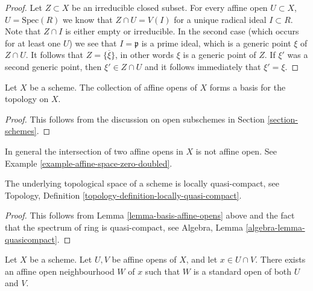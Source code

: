 \begin{proof}
Let $Z \subset X$ be an irreducible closed subset.
For every affine open $U \subset X$, $U = \text{Spec}(R)$
we know that $Z \cap U = V(I)$ for a unique
radical ideal $I \subset R$. Note that $Z \cap I$ is either
empty or irreducible. In the second case (which occurs
for at least one $U$) we see that $I = \mathfrak p$
is a prime ideal, which is a generic point $\xi$ of $Z \cap U$.
It follows that $Z = \overline{\{\xi\}}$, in other words
$\xi$ is a generic point of $Z$. If $\xi'$ was a second
generic point, then $\xi' \in Z \cap U$ and it follows
immediately that $\xi' = \xi$.
\end{proof}

\begin{lemma}
\label{lemma-basis-affine-opens}
Let $X$ be a scheme. The collection of affine opens
of $X$ forms a basis for the topology on $X$.
\end{lemma}

\begin{proof}
This follows from the discussion on open subschemes
in Section \ref{section-schemes}.
\end{proof}

\begin{remark}
\label{remark-intersection-affine-opens}
In general the intersection of two affine opens in $X$
is not affine open. See Example \ref{example-affine-space-zero-doubled}.
\end{remark}

\begin{lemma}
\label{lemma-locally-quasi-compact}
The underlying topological space of a scheme is
locally quasi-compact, see
Topology, Definition \ref{topology-definition-locally-quasi-compact}.
\end{lemma}

\begin{proof}
This follows from Lemma \ref{lemma-basis-affine-opens} above
and the fact that the spectrum of ring is quasi-compact, see
Algebra, Lemma \ref{algebra-lemma-quasicompact}.
\end{proof}

\begin{lemma}
\label{lemma-standard-open-two-affines}
Let $X$ be a scheme.
Let $U, V$ be affine opens of $X$, and let $x \in U \cap V$.
There exists an affine open neighbourhood $W$ of $x$
such that $W$ is a standard open of both $U$ and $V$.
\end{lemma}

